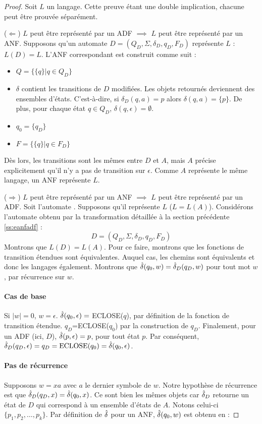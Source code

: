 \begin{proof}
	 Soit $L$ un langage. Cette preuve étant une double implication, chacune peut être prouvée séparément.
	
	($\Leftarrow$) $L$ peut être représenté par un ADF $\implies$ $L$ peut être représenté par un ANF. Supposons qu'un automate $D=(Q_D, \Sigma, \delta_D, q_D, F_D)$ représente $L$ : $L(D)=L$. 
	L'ANF \automaton correspondant est construit comme suit :
	
	\begin{itemize}
		\item $Q=\{\{q\}|q\in Q_D\}$
		\item $\delta$ contient les transitions de $D$ modifiées. Les objets retournés deviennent des ensembles d'états. C'est-à-dire, si $\delta_D(q,a)=p$ alors $\delta(q,a)=\{p\}$. De plus, pour chaque état $q\in Q_D$, $\delta(q,\epsilon)=\emptyset$. 
		\item $q_0=\{q_D\}$
		\item $F=\{\{q\}| q\in F_D\}$
	\end{itemize}
	 
	 Dès lors, les transitions sont les mêmes entre $D$ et $A$, mais $A$ précise explicitement qu'il n'y a pas de transition sur $\epsilon$. Comme $A$ représente le même langage, un ANF représente $L$.
	
	
	($\Rightarrow$) $L$ peut être représenté par un ANF $\implies$ $L$ peut être représenté par un ADF. Soit l'automate \automaton. Supposons qu'il représente $L$ ($L=L(A)$). Considérons l'automate obtenu par la transformation détaillée à la section précédente \ref{ss:eanfadf} :
	$$
	D=(Q_D, \Sigma, \delta_D, q_D, F_D)
	$$
	Montrons que $L(D)=L(A)$. Pour ce faire, montrons que les fonctions de transition étendues sont équivalentes. Auquel cas, les chemins sont équivalents et donc les langages également.
	Montrons que $\hat{\delta}(q_0,w)=\hat{\delta}_D(q_D,w)$ pour tout mot $w$, par récurrence sur $w$.
	
	\paragraph{Cas de base} Si $|w|=0$, $w=\epsilon$. $\hat{\delta}(q_0,\epsilon)=$ ECLOSE($q$), par définition de la fonction de transition étendue. $q_D$=ECLOSE($q_0$) par la construction de $q_D$. Finalement, pour un ADF (ici, $D$), $\hat{\delta}(p,\epsilon)=p$, pour tout état $p$. Par conséquent, $\hat{\delta}_D(q_D,\epsilon)=q_D=\text{ECLOSE(}q_0\text{)}=\hat{\delta}(q_0,\epsilon)$.
	
	\paragraph{Pas de récurrence} Supposons $w=xa$ avec $a$ le dernier symbole de $w$. Notre hypothèse de récurrence est que $\hat{\delta}_D(q_D,x)=\hat{\delta}(q_0,x)$. Ce sont bien les mêmes objets car $\hat{\delta}_D$ retourne un état de $D$ qui correspond à un ensemble d'états de $A$. Notons celui-ci $\{p_1,p_2, \dots, p_k\}$. Par définition de $\hat{\delta}$ pour un ANF, $\hat{\delta}(q_0,w)$ est obtenu en :
	

\end{proof}
